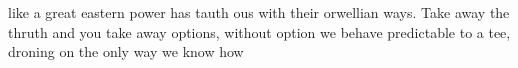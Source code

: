 like a great eastern power has tauth ous with their orwellian ways. Take away the thruth and you take away options, without option we behave predictable to a tee, droning on the only way we know how
